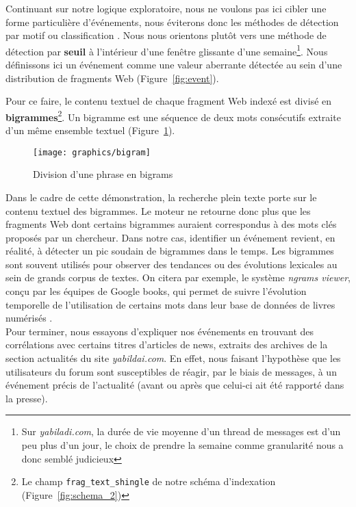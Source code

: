 \documentclass[symmetric,justified,marginals=raggedouter]{tufte-book}
\begin{document}
Continuant sur notre logique exploratoire, nous ne voulons pas ici cibler une forme particulière d'événements, nous éviterons donc les méthodes de détection par motif \citep{chaney_detecting_2016} ou classification  \citep{dodds_temporal_2011}. Nous nous orientons plutôt vers une méthode de détection par \textbf{seuil} \citep{fung_parameter_2005} à l'intérieur d'une fenêtre glissante d'une semaine\footnote{\RaggedOuter Sur \textit{yabiladi.com}, la durée de vie moyenne d'un thread de messages est d'un peu plus d'un jour, le choix de prendre la semaine comme granularité nous a donc semblé judicieux}. Nous définissons ici un événement comme une valeur aberrante détectée au sein d'une distribution de fragments Web (Figure~\ref{fig:event}).

Pour ce faire, le contenu textuel de chaque fragment Web indexé est divisé en \textbf{bigrammes}\footnote{\RaggedOuter Le champ \texttt{frag\_text\_shingle} de notre schéma d'indexation (Figure~\ref{fig:schema_2})}. Un bigramme est une séquence de deux mots consécutifs extraite d'un même ensemble textuel (Figure~\ref{fig:bigram}). 

\begin{figure}%
  \texttt{[image: graphics/bigram]}
  \caption{Division d'une phrase en bigrams}
  \label{fig:bigram}
\end{figure} 

\noindent Dans le cadre de cette démonstration, la recherche plein texte porte sur le contenu textuel des bigrammes. Le moteur ne retourne donc plus que les fragments Web dont certains bigrammes auraient correspondus à des mots clés proposés par un chercheur. Dans notre cas, identifier un événement revient, en réalité, à détecter un pic soudain de bigrammes dans le temps. Les bigrammes sont souvent utilisés pour observer des tendances ou des évolutions lexicales au sein de grands corpus de textes. On citera par exemple, le système \textit{ngrams viewer}, conçu par les équipes de Google books, qui permet de suivre l'évolution temporelle de l'utilisation de certains mots dans leur base de données de livres numérisés \citep{michel_quantitative_2011}.\\

\noindent Pour terminer, nous essayons d'expliquer nos événements en trouvant des corrélations avec certains titres d'articles de news, extraits des archives de la section actualités du site \textit{yabildai.com}. En effet, nous faisant l'hypothèse que les utilisateurs du forum sont susceptibles de réagir, par le biais de messages, à un événement précis de l'actualité (avant ou après que celui-ci ait été rapporté dans la presse). 
\end{document}
